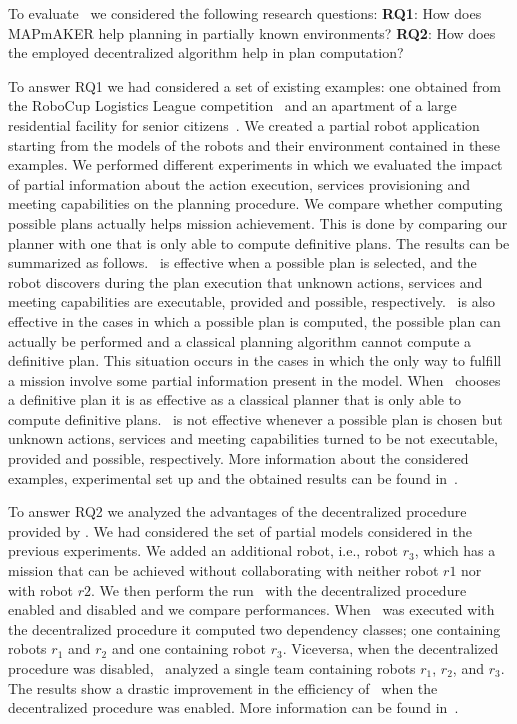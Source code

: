 To evaluate  \toolName\ we considered the following research questions: \textbf{RQ1}: How does MAPmAKER help planning in partially known environments? \textbf{RQ2}: How does the employed decentralized algorithm help in plan computation?

To answer RQ1 we  had considered a set of existing examples:
one obtained from the RoboCup Logistics League competition~\cite{karrasrobocup} and an apartment of a large residential facility for senior citizens~\cite{map}.
We created a partial robot application starting from the models of the robots and their environment contained in these examples.
We performed different experiments in which we evaluated the impact of partial information about the action execution, services provisioning and meeting capabilities on the planning procedure.
We compare whether computing possible plans actually helps mission achievement.
This is done by comparing our planner with one that is only able to compute definitive plans.
The results can be summarized as follows.
\toolName\ is effective when  a possible plan is selected, and the robot discovers during the plan execution 
that unknown actions, services and meeting capabilities are executable, provided and possible, respectively.
\toolName\ is also effective in the cases in which a possible plan  is computed, the possible plan can actually be performed and a classical planning algorithm cannot compute a definitive plan.
This situation occurs in the cases in which the only way to fulfill a mission involve some partial information present in the model.
When \toolName\ chooses a definitive plan it is as effective as a classical planner that is only able to compute definitive plans.
\toolName\ is not effective whenever a possible plan is chosen but  unknown actions, services and meeting capabilities turned to be not executable, provided and possible, respectively.
More information about the considered examples, experimental set up and the obtained results can be found in~\cite{mapmaker17}.

To answer RQ2 we analyzed the advantages of the decentralized procedure provided by \toolName.
We had considered the set of partial models considered in the previous experiments. 
We added an additional robot, i.e., robot $r_3$, which has a mission that can be achieved without collaborating with neither  robot $r1$ nor with robot $r2$. 
We then perform the run \toolName\ with the decentralized procedure enabled and disabled and we compare performances. 
When \toolName\ was executed with the  decentralized procedure it computed two dependency classes; one containing robots $r_1$ and $r_2$ and one containing robot $r_3$. 
Viceversa, when the decentralized procedure was disabled, \toolName\ 
analyzed a single team containing  robots $r_1$, $r_2$, and $r_3$. 
The results show a drastic improvement in the efficiency of \toolName\ when the decentralized procedure was enabled.
More information can be found in~\cite{mapmaker17}.

